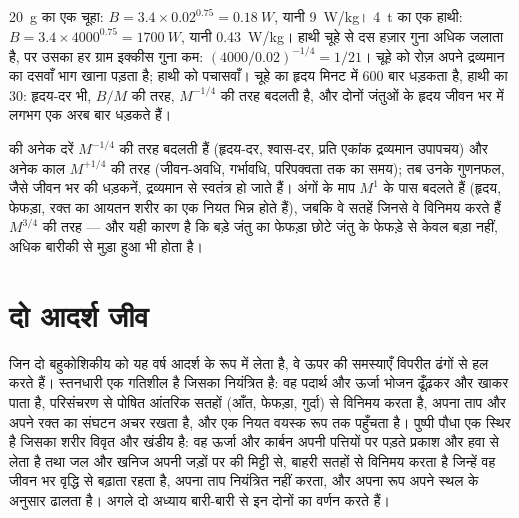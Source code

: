 \begin{example}[चूहा और हाथी]\label{ex:b1:organism-environment:mouseelephant}
\qty{20}{g} का एक चूहा: $B = 3.4\times 0.02^{0.75} = \qty{0.18}{W}$,
यानी \qty{9}{W/kg}। \qty{4}{t} का एक हाथी: $B = 3.4\times 4000^{0.75} =
\qty{1700}{W}$, यानी \qty{0.43}{W/kg}। हाथी चूहे से दस हज़ार गुना अधिक
जलाता है, पर उसका हर ग्राम इक्कीस गुना कम:
$(4000/0.02)^{-1/4} = 1/21$। चूहे को रोज़ अपने द्रव्यमान का दसवाँ भाग
खाना पड़ता है; हाथी को पचासवाँ। चूहे का हृदय मिनट में \qty{600}{} बार
धड़कता है, हाथी का \qty{30}{}: हृदय-दर भी, $B/M$ की तरह, $M^{-1/4}$ की
तरह बदलती है, और दोनों जंतुओं के हृदय जीवन भर में लगभग एक अरब बार धड़कते
हैं।
\end{example}

\begin{remark}\label{rem:b1:organism-environment:consequences}
 की अनेक दरें $M^{-1/4}$ की तरह बदलती हैं (हृदय-दर, श्वास-दर, प्रति
एकांक द्रव्यमान उपापचय) और अनेक काल $M^{+1/4}$ की तरह (जीवन-अवधि,
गर्भावधि, परिपक्वता तक का समय); तब उनके गुणनफल, जैसे जीवन भर की
धड़कनें, द्रव्यमान से स्वतंत्र हो जाते हैं। अंगों के माप $M^{1}$ के पास
बदलते हैं (हृदय, फेफड़ा, रक्त का आयतन शरीर का एक नियत भिन्न होते हैं),
जबकि वे सतहें जिनसे वे विनिमय करते हैं $M^{3/4}$ की तरह --- और यही कारण
है कि बड़े जंतु का फेफड़ा छोटे जंतु के फेफड़े से केवल बड़ा नहीं, अधिक
बारीकी से मुड़ा हुआ भी होता है।
\end{remark}

\section{दो आदर्श जीव}

\begin{proposition}[एक स्तनधारी और एक पुष्पी पौधा]\label{prop:b1:organism-environment:models}
जिन दो बहुकोशिकीय  को यह वर्ष आदर्श के रूप में लेता है, वे ऊपर की
समस्याएँ विपरीत ढंगों से हल करते हैं। स्तनधारी एक गतिशील  है
जिसका  नियंत्रित है: वह पदार्थ और ऊर्जा भोजन ढूँढ़कर और
खाकर पाता है, परिसंचरण से पोषित आंतरिक सतहों (आँत, फेफड़ा, गुर्दा) से
विनिमय करता है, अपना ताप और अपने रक्त का संघटन अचर रखता है, और एक नियत
वयस्क रूप तक पहुँचता है। पुष्पी पौधा एक स्थिर  है जिसका
शरीर विवृत और खंडीय है: वह ऊर्जा और कार्बन अपनी पत्तियों पर पड़ते प्रकाश
और हवा से लेता है तथा जल और खनिज अपनी जड़ों पर की मिट्टी से, बाहरी सतहों
से विनिमय करता है जिन्हें वह जीवन भर वृद्धि से बढ़ाता रहता है, अपना ताप
नियंत्रित नहीं करता, और अपना रूप अपने स्थल के अनुसार ढालता है। अगले दो
अध्याय बारी-बारी से इन दोनों का वर्णन करते हैं।
\end{proposition}

